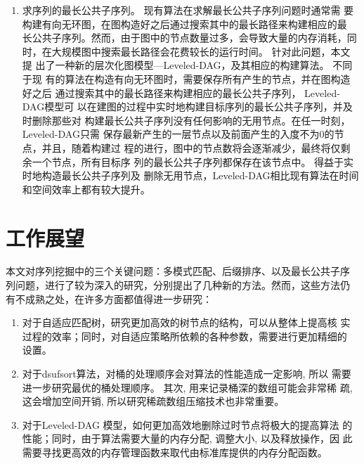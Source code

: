 \begin{enumerate}
\item 求序列的最长公共子序列。 现有算法在求解最长公共子序列问题时通常需
  要构建有向无环图，在图构造好之后通过搜索其中的最长路径来构建相应的最
  长公共子序列。然而，由于图中的节点数量过多，会导致大量的内存消耗，同
  时，在大规模图中搜索最长路径会花费较长的运行时间。 针对此问题，本文提
  出了一种新的层次化图模型---Leveled-DAG，及其相应的构建算法。 不同于现
  有的算法在构造有向无环图时，需要保存所有产生的节点，并在图构造好之后
  通过搜索其中的最长路径来构建相应的最长公共子序列， Leveled-DAG模型可
  以在建图的过程中实时地构建目标序列的最长公共子序列，并及时删除那些对
  构建最长公共子序列没有任何影响的无用节点。在任一时刻，Leveled-DAG只需
  保存最新产生的一层节点以及前面产生的入度不为0的节点，并且，随着构建过
  程的进行，图中的节点数将会逐渐减少，最终将仅剩余一个节点，所有目标序
  列的最长公共子序列都保存在该节点中。 得益于实时地构造最长公共子序列及
  删除无用节点，Leveled-DAG相比现有算法在时间和空间效率上都有较大提升。
  \end{enumerate}

\section{工作展望}

本文对序列挖掘中的三个关键问题：多模式匹配、后缀排序、以及最长公共子序
列问题，进行了较为深入的研究，分别提出了几种新的方法。然而，这些方法仍
有不成熟之处，在许多方面都值得进一步研究：

\begin{enumerate}
\item 对于自适应匹配树，研究更加高效的树节点的结构，可以从整体上提高核
  实过程的效率；同时，对自适应策略所依赖的各种参数，需要进行更加精细的
  设置。
\item 对于dsufsort算法，对桶的处理顺序会对算法的性能造成一定影响, 所以
  需要进一步研究最优的桶处理顺序。 其次, 用来记录桶深的数组可能会非常稀
  疏, 这会增加空间开销, 所以研究稀疏数组压缩技术也非常重要。
\item 对于Leveled-DAG 模型，如何更加高效地删除过时节点将极大的提高算法
  的性能；同时，由于算法需要大量的内存分配, 调整大小, 以及释放操作，因
  此需要寻找更高效的内存管理函数来取代由标准库提供的内存分配函数。

\end{enumerate}
